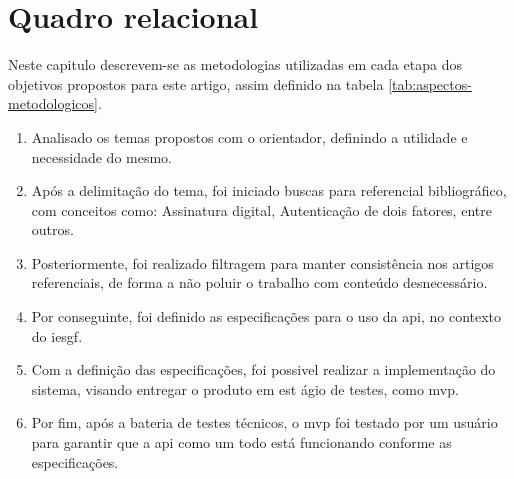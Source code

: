 \section{Quadro relacional}\label{sec:quadro-relacional}

Neste capitulo descrevem-se as metodologias utilizadas em cada
etapa dos objetivos propostos para este artigo, assim definido na
tabela \ref{tab:aspectos-metodologicos}.

\newcommand{\definicaoTema}{
    \item Analisado os temas propostos com o orientador, definindo
    a utilidade e necessidade do mesmo.
}

\newcommand{\buscaArtigos}{
    \item Após a delimitação do tema, foi iniciado buscas para
    referencial bibliográfico, com conceitos como: Assinatura
    digital, Autenticação de dois fatores, entre outros.
}

\newcommand{\filtragemArtigos}{
    \item Posteriormente, foi realizado filtragem para manter
    consistência nos artigos referenciais, de forma a não poluir o
    trabalho com conteúdo desnecessário.
}

\newcommand{\definicaoEspecificacoes}{
    \item Por conseguinte, foi definido as especificações para o
    uso da \acrshort{api}, no contexto do \acrfull{iesgf}.
}

\newcommand{\implementacaoAPI}{
    \item Com a definição das especificações, foi possivel realizar
    a implementação do sistema, visando entregar o produto em est ágio
    de testes, como \acrfull{mvp}.
}

\newcommand{\testeAPI}{
    \item Por fim, após a bateria de testes técnicos, o \acrshort{mvp}
    foi testado por um usuário para garantir que a \acrshort{api}
    como um todo está funcionando conforme as especificações.
}

\begin{enumerate}[label=\arabic*\textdegree\space Etapa:,
    leftmargin=2cm]
    \definicaoTema
    \buscaArtigos
    \filtragemArtigos
    \definicaoEspecificacoes
    \implementacaoAPI
    \testeAPI
\end{enumerate}

